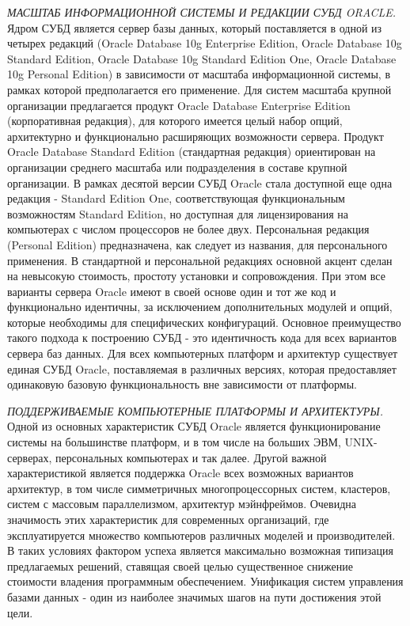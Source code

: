 \textit{МАСШТАБ ИНФОРМАЦИОННОЙ СИСТЕМЫ И РЕДАКЦИИ СУБД ORACLE.}
Ядром СУБД является сервер базы данных, который поставляется в одной из четырех редакций (Oracle Database 10g Enterprise Edition, Oracle Database 10g Standard Edition, Oracle Database 10g Standard Edition One, Oracle Database 10g Personal Edition) в зависимости от масштаба информационной системы, в рамках которой предполагается его применение.
Для систем масштаба крупной организации предлагается продукт Oracle Database Enterprise Edition (корпоративная редакция), для которого имеется целый набор опций, архитектурно и функционально расширяющих возможности сервера. Продукт Oracle Database Standard Edition (стандартная редакция) ориентирован на организации среднего масштаба или подразделения в составе крупной организации. В рамках десятой версии СУБД Oracle стала доступной еще одна редакция - Standard Edition One, соответствующая функциональным возможностям Standard Edition, но доступная для лицензирования на компьютерах с числом процессоров не более двух. Персональная редакция (Personal Edition) предназначена, как следует из названия, для персонального применения. В стандартной и персональной редакциях основной акцент сделан на невысокую стоимость, простоту установки и сопровождения. При этом все варианты сервера Oracle имеют в своей основе один и тот же код и функционально идентичны, за исключением дополнительных модулей и опций, которые необходимы для специфических конфигураций. Основное преимущество такого подхода к построению СУБД - это идентичность кода для всех вариантов сервера баз данных. Для всех компьютерных платформ и архитектур существует единая СУБД Oracle, поставляемая в различных версиях, которая предоставляет одинаковую базовую функциональность вне зависимости от платформы.

\textit{ПОДДЕРЖИВАЕМЫЕ КОМПЬЮТЕРНЫЕ ПЛАТФОРМЫ И АРХИТЕКТУРЫ.}
Одной из основных характеристик СУБД Oracle является функционирование системы на большинстве платформ, и в том числе на больших ЭВМ, UNIX-серверах, персональных компьютерах и так далее. Другой важной характеристикой является поддержка Oracle всех возможных вариантов архитектур, в том числе симметричных многопроцессорных систем, кластеров, систем с массовым параллелизмом, архитектур мэйнфреймов. Очевидна значимость этих характеристик для современных организаций, где эксплуатируется множество компьютеров различных моделей и производителей. В таких условиях фактором успеха является максимально возможная типизация предлагаемых решений, ставящая своей целью существенное снижение стоимости владения программным обеспечением. Унификация систем управления базами данных - один из наиболее значимых шагов на пути достижения этой цели.

